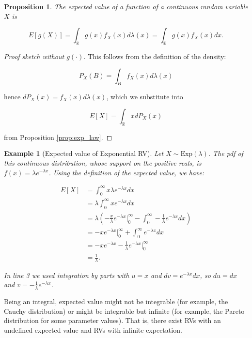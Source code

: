 \documentclass{book}
\theoremstyle{plain}%
\newtheorem{prototheorem}{Example}[section]
\newenvironment{cexample}
   {\colorlet{shadecolor}{gray!10}\begin{shaded}\begin{prototheorem}}
   {\end{prototheorem}\end{shaded}}
\newtheorem{proposition}{Proposition}[section]
\theoremstyle{definition}
\begin{document}
\begin{proposition}
The expected value of a function of a continuous random variable $X$ is

$$E[g(X)] = \int_\mathbb{R} g(x) f_X(x) d\lambda(x) = \int_\mathbb{R} g(x) f_X(x) dx.$$
\end{proposition}

\begin{proof}[Proof sketch without $g(\cdot)$]
This follows from the definition of the density:

$$P_X(B) = \int_B f_X(x) d\lambda(x)$$

hence $dP_X(x) = f_X(x) d\lambda(x)$, which we substitute into

$$E[X] = \int_{\mathbb{R}} x dP_X(x)$$

from Proposition \ref{prop:exp_law}.

\end{proof}

\begin{cexample}[Expected value of Exponential RV]
Let $X \sim \text{Exp}(\lambda)$. The pdf of this continuous distribution, whose support on the positive reals, is $f(x) = \lambda e^{-\lambda x}$. Using the definition of the expected value, we have:

\begin{align*}
E[X] &= \int_0^\infty x \lambda e^{-\lambda x} dx \\
&= \lambda \int_0^\infty x e^{-\lambda x} dx \\
&= \lambda\left(-\frac{x}{\lambda}e^{-\lambda x}\bigg\rvert_0^\infty -  \int_0^\infty -\frac{1}{\lambda}e^{-\lambda x} dx\right)\\
&= -xe^{-\lambda x}\bigg\rvert_0^\infty + \int_0^\infty e^{-\lambda x} dx\\
&= -xe^{-\lambda x} -  \frac{1}{\lambda}e^{-\lambda x} \bigg\rvert_0^\infty \\
&= \frac{1}{\lambda}.
\end{align*}

In line 3 we used integration by parts with $u = x$ and $dv = e^{-\lambda x} dx$, so $du = dx$ and $v = -\frac{1}{\lambda}e^{-\lambda x}$. 
\end{cexample}

Being an integral, expected value might not be integrable (for example, the Cauchy distribution) or might be integrable but infinite (for example, the Pareto distribution for some parameter values). That is, there exist RVs with an undefined expected value and RVs with infinite expectation.
\end{document}
